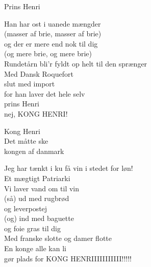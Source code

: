 \begin{song}{Prins Henri}
\begin{SBVerse} 
  Han har ost i uanede mængder \\
(masser af brie, masser af brie) \\
og der er mere end nok til dig \\
(og mere brie, og mere brie) \\
Rundetårn bli’r fyldt op helt til den sprænger \\
Med Dansk Roquefort  \\
slut med import\\
for han laver det hele selv \\
prins Henri \\
nej, KONG HENRI! \\
\end{SBVerse}

\begin{SBVerse}
Kong Henri \\
Det måtte ske \\
kongen af danmark \\
\end{SBVerse}

\begin{SBVerse}
Jeg har tænkt i ku få vin i stedet for løn! \\
Et mægtigt Patriarki \\
Vi laver vand om til vin \\
(så) ud med rugbrød \\
og leverpostej \\
(og) ind med baguette \\
og foie gras til dig \\
Med franske slotte og damer flotte \\
En konge alle kan li \\
gør plads for KONG HENRIIIIIIIIIII!!!!! \\
\end{SBVerse}

\end{song}